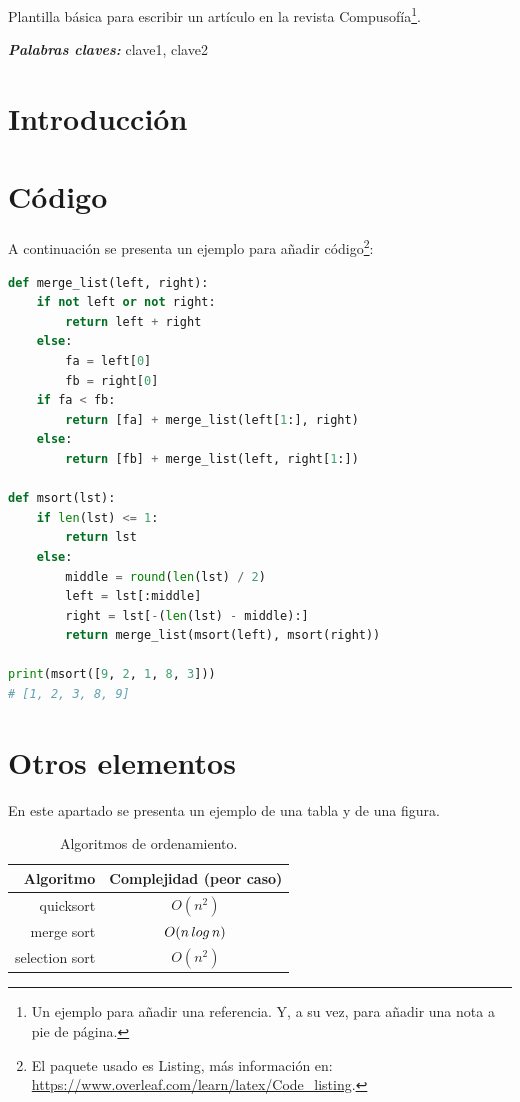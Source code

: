 \documentclass{compusofia}
\title{\color{colorprincipal} \nombrearticulo}
\author{\nombreautor}
\renewenvironment{abstract}{{\color{colorprincipal}\textbf{RESUMEN }}}{}
\providecommand{\keywords}[1]{\textbf{\color{colorprincipal}\textit{Palabras claves:}} #1}
\begin{document}
\maketitle

\begin{abstract}
Plantilla básica para escribir un artículo en la revista  Compusofía\cite{DBLP:books/sp/Turner18}\footnote{Un ejemplo para añadir una referencia. Y, a su vez, para añadir una nota a pie de página.}.
\end{abstract} \par
\keywords{clave1, clave2}

\section{Introducción}

\section{Código}
A continuación se presenta un ejemplo para añadir código\footnote{El paquete usado es Listing, más información en: \url{https://www.overleaf.com/learn/latex/Code_listing}.}:

\begin{lstlisting}[language=Python]
def merge_list(left, right):
    if not left or not right:
        return left + right
    else:
        fa = left[0]
        fb = right[0]
    if fa < fb:
        return [fa] + merge_list(left[1:], right)
    else:
        return [fb] + merge_list(left, right[1:])
    
def msort(lst):
    if len(lst) <= 1:
        return lst
    else:
        middle = round(len(lst) / 2)
        left = lst[:middle]
        right = lst[-(len(lst) - middle):]
        return merge_list(msort(left), msort(right))
    
print(msort([9, 2, 1, 8, 3]))
# [1, 2, 3, 8, 9]
\end{lstlisting}

\section{Otros elementos}
En este apartado se presenta un ejemplo de una tabla y de una figura.

\begin{table}[H]
    \begin{center}
        \begin{tabular}{| r | c |}\hline
            Algoritmo & Complejidad (peor caso) \\ \hline
            quicksort &  $O(n^2)$ \\
            merge sort &  $O(n\thinspace log\thinspace n)$  \\
            selection sort & $O(n^2)$ \\ \hline
            \end{tabular}
            \caption{Algoritmos de ordenamiento.}
        \label{tab:algoritmos}
    \end{center}
\end{table}
\end{document}
